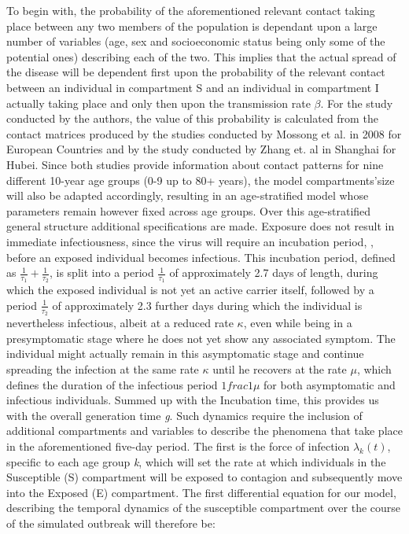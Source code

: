 \documentclass[../main.tex]{subfiles}
\begin{document}
To begin with, the probability of the aforementioned relevant contact taking place between any two members of the population is dependant upon a large number of variables (age, sex and socioeconomic status being only some of the potential ones) describing each of the two. This implies that the actual spread of the disease will be dependent first upon the probability of the relevant contact between an individual in compartment S and an individual in compartment I actually taking place and only then upon the transmission rate $\beta$. For the study conducted by the authors, the value of this probability is calculated from the contact matrices produced by the studies conducted by Mossong et al. in 2008 for European Countries and by the study conducted by Zhang et. al in Shanghai for Hubei. Since both studies provide information about contact patterns for nine different 10-year age groups (0-9 up to 80+ years), the model compartments'size will also be adapted accordingly, resulting in an age-stratified model whose parameters remain however fixed across age groups.
Over this age-stratified general structure additional specifications are made. Exposure does not result in immediate infectiousness, since the virus will require an incubation period, , before an exposed individual becomes infectious. This incubation period, defined as $\frac{1}{\tau_{1}} + \frac{1}{\tau_{2}}$, is split into a period $\frac{1}{\tau_{1}}$ of approximately 2.7 days of length, during which the exposed individual is not yet an active carrier itself, followed by a period $\frac{1}{\tau_{2}}$ of approximately 2.3 further days during which the individual is nevertheless infectious, albeit at a reduced rate \textit{$\kappa$}, even while being in a presymptomatic stage where he does not yet show any associated symptom. The individual might actually remain in this asymptomatic stage and continue spreading the infection at the same rate \textit{$\kappa$} until he recovers at the rate $\mu$, which defines the duration of the infectious period $1frac{1}{\mu}$ for both asymptomatic and infectious individuals. Summed up with the Incubation time, this provides us with the overall generation time \textit{g}.
Such dynamics require the inclusion of additional compartments and variables to describe the phenomena that take place in the aforementioned five-day period. The first is the force of infection $\lambda_{k}(t)$, specific to each age group \textit{k}, which will set the rate at which individuals in the Susceptible (S) compartment will be exposed to contagion and subsequently move into the Exposed (E) compartment.
The first differential equation for our model, describing the temporal dynamics of the susceptible compartment over the course of the simulated outbreak will therefore be:
\end{document}
